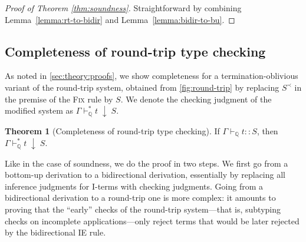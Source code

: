 \documentclass[10pt,preprint]{sigplanconf-pldi16}
\theoremstyle{definition}
\newtheorem{theorem}{Theorem}
\newcommand{\env}{\Gamma}
\newcommand{\consume}{\;\downarrow\;}
\newcommand{\before}{\prec}
\newcommand{\quals}{\mathbb{Q}}
\newcommand{\entailsQ}{\vdash_{\quals}}
\begin{document}
\begin{proof}[Proof of Theorem \ref{thm:soundness}]
Straightforward by combining Lemma~\ref{lemma:rt-to-bidir} and Lemma~\ref{lemma:bidir-to-bu}.
\end{proof}

\subsection{Completeness of round-trip type checking}

As noted in \autoref{sec:theory:proofs},
we show completeness for a termination-oblivious variant of the round-trip system,
obtained from \autoref{fig:round-trip} by replacing $S^{\before}$ in the premise of the \textsc{Fix} rule by $S$.
We denote the checking judgment of the modified system as $\env \entailsQ^* t \consume S$.

\begin{theorem}[Completeness of round-trip type checking]\label{thm:completeness}
If $\env\entailsQ t :: S$, then $\env \entailsQ^* t \consume S$.
\end{theorem}

Like in the case of soundness, we do the proof in two steps.
We first go from a bottom-up derivation to a bidirectional derivation,
essentially by replacing all inference judgments for I-terms with checking judgments. 
Going from a bidirectional derivation to a round-trip one is more complex:
it amounts to proving that the ``early'' checks of the round-trip system---that is, subtyping checks on incomplete applications---only reject terms that would be later rejected by the bidirectional \textsc{IE} rule.
\end{document}
